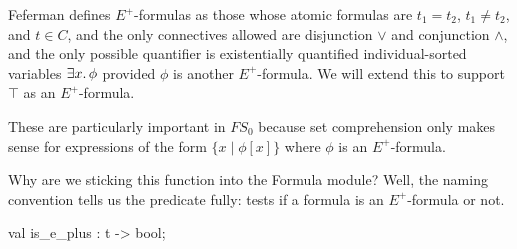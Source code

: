 \nwendcode{}\nwdocspar
\begin{node}
Feferman defines $E^{+}$-formulas as those whose atomic formulas are
$t_{1}=t_{2}$, $t_{1}\neq t_{2}$, and $t\in C$, and the only
connectives allowed are disjunction $\lor$ and conjunction $\land$,
and the only possible quantifier is existentially quantified
individual-sorted variables $\exists x\ldotp\phi$ provided $\phi$ is
another $E^{+}$-formula. We will extend this to support $\top$ as an
$E^{+}$-formula.

These are particularly important in $FS_{0}$ because set comprehension
only makes sense for expressions of the form $\{x\mid\phi[x]\}$ where
$\phi$ is an $E^{+}$-formula.

Why are we sticking this function into the {\Tt{}Formula\nwendquote} module? Well,
the naming convention tells us the predicate fully: {\Tt{}\nwendquote}
tests if a formula is an $E^{+}$-formula or not.
\end{node}

\nwenddocs{}\plusendmoddef\nwstartdeflinemarkup{}\nwenddeflinemarkup
val is_e_plus : t -> bool;
\nwendcode{}\nwdocspar

